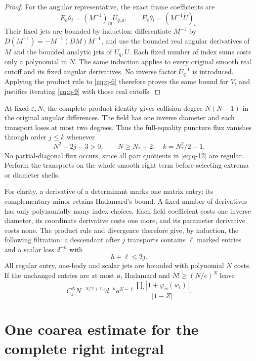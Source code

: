\documentclass[11pt]{article}
\numberwithin{equation}{section}
\theoremstyle{remark}\newtheorem{remark}[theorem]{Remark}
\begin{document}
\begin{proof}
For the angular representative, the exact frame coefficients are
\[
 E_a\theta_i=(M^{-1})_{ia}U_{q,a},\qquad
 E_s\theta_i=(M^{-1}\dot U)_i.
\]
Their fixed jets are bounded by induction: differentiate
$M^{-1}$ by $D(M^{-1})=-M^{-1}(DM)M^{-1}$, and use the bounded
real angular derivatives of $M$ and the bounded analytic jets
of $U_q,\dot U$. Each fixed number of index sums costs only a
polynomial in $N$. The same induction applies to every original
smooth real cutoff and its fixed angular derivatives.
No inverse factor $U_q^{-1}$ is introduced. Applying the product
rule to \eqref{eq:q-6} therefore proves the same bound for $V$,
and justifies iterating \eqref{eq:q-9} with those real cutoffs.
\end{proof}

At fixed $\varepsilon,N$, the complete product identity gives
collision degree $N(N-1)$ in the original angular differences.
The field has one inverse diameter and each transport loses at most
two degrees. Thus the full-equality puncture flux vanishes through
order $j\le k$ whenever
\begin{equation}\label{eq:q-18}
N^2-2j-3>0,\qquad N\ge N_*+2,\quad k=N_*^2/2-1.
\end{equation}
No partial-diagonal flux occurs, since all pair quotients in \eqref{eq:q-12}
are regular. Perform the transports on the whole smooth right term
before selecting extrema or diameter shells.

For clarity, a derivative of a determinant marks one matrix entry;
its complementary minor retains Hadamard's bound. A fixed number
of derivatives has only polynomially many index choices. Each
field coefficient costs one inverse diameter, its coordinate
derivative costs one more, and its parameter derivative costs none.
The product rule and divergence therefore give, by induction,
the following filtration:
a descendant after $j$ transports contains $\ell$ marked entries and
a scalar loss $d^{-h}$ with
\begin{equation}\label{eq:q-19}
h+\ell\le2j.
\end{equation}
All regular entry, one-body and scalar jets are bounded with
polynomial $N$ costs. If the unchanged entries are at most $a$,
Hadamard and $N!\ge(N/e)^N$ leave
\begin{equation}\label{eq:q-20}
C_j^N N^{-N/2+C_j}d^{-h}a^{N-\ell}
 \frac{\prod_i|1+\varphi_w(w_i)|}{|1-Z|}.
\end{equation}

\section{One coarea estimate for the complete right integral}\label{sec:global-integration}
\end{document}
